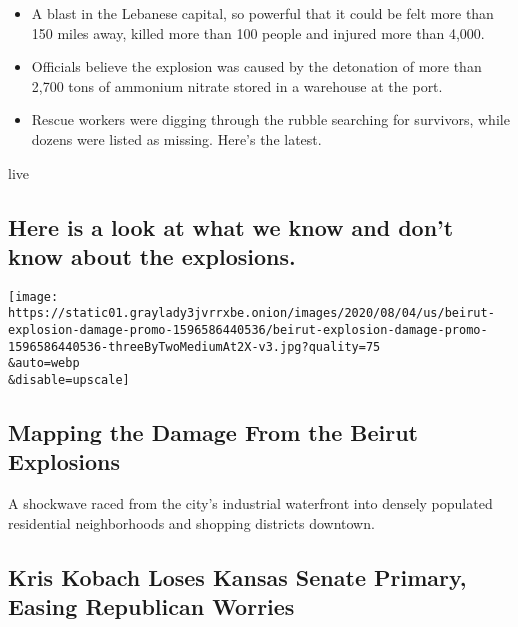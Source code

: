 \begin{itemize}
\tightlist
\item
  A blast in the Lebanese capital, so powerful that it could be felt
  more than 150 miles away, killed more than 100 people and injured more
  than 4,000.
\item
  Officials believe the explosion was caused by the detonation of more
  than 2,700 tons of ammonium nitrate stored in a warehouse at the port.
\item
  Rescue workers were digging through the rubble searching for
  survivors, while dozens were listed as missing. Here's the latest.
\end{itemize}

live

\href{/2020/08/05/world/middleeast/beirut-explosion-what-happened.html}{}

\hypertarget{here-is-a-look-at-what-we-know-and-dont-know-about-the-explosions}{%
\subsection{Here is a look at what we know and don't know about the
explosions.}\label{here-is-a-look-at-what-we-know-and-dont-know-about-the-explosions}}

\href{/interactive/2020/08/04/world/middleeast/beirut-explosion-damage.html}{}

\texttt{[image: https://static01.graylady3jvrrxbe.onion/images/2020/08/04/us/beirut-explosion-damage-promo-1596586440536/beirut-explosion-damage-promo-1596586440536-threeByTwoMediumAt2X-v3.jpg?quality=75\\\&auto=webp\\\&disable=upscale]}

\href{/interactive/2020/08/04/world/middleeast/beirut-explosion-damage.html}{}

\hypertarget{mapping-the-damage-from-the-beirut-explosions}{%
\subsection{Mapping the Damage From the Beirut
Explosions}\label{mapping-the-damage-from-the-beirut-explosions}}

A shockwave raced from the city's industrial waterfront into densely
populated residential neighborhoods and shopping districts downtown.

\href{/2020/08/04/us/politics/kobach-tlaib.html}{}

\hypertarget{kris-kobach-loses-kansas-senate-primary-easing-republican-worries}{%
\subsection{Kris Kobach Loses Kansas Senate Primary, Easing Republican
Worries}\label{kris-kobach-loses-kansas-senate-primary-easing-republican-worries}}

